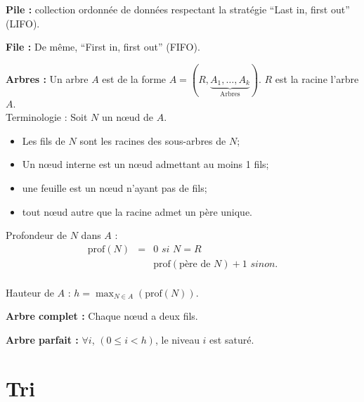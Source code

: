 \documentclass[a4paper, 8pt]{article}
\begin{document}
\begin{multicols*}{3}
\textbf{Pile :} collection ordonnée de données respectant la stratégie \enquote{Last in, first out} (LIFO).

\textbf{File :} De même, \enquote{First in, first out} (FIFO).

\textbf{Arbres :} Un arbre $A$ est de la forme $A = (R, \underbrace{A_1, \ldots, A_k}_{\text{Arbres}})$. $R$ est la racine l'arbre $A$.\\
Terminologie : Soit $N$ un nœud de $A$.
\begin{itemize}
\item Les fils de $N$ sont les racines des sous-arbres de $N$;
\item Un nœud interne est un nœud admettant au moins 1 fils;
\item une feuille est un nœud n'ayant pas de fils;
\item tout nœud autre que la racine admet un père unique.
\end{itemize}

Profondeur de $N$ dans $A$ :
\[
\begin{array}{rc|l}
\text{prof}(N) & = & 0 \textit{ si } N=R  \\
 & & \text{prof}(\text{père de }N) + 1 \textit{ sinon.}  \\
\end{array}
\]

Hauteur de $A$ : $h = \displaystyle \max_{N\in A}\left(\text{prof}(N)\right).$

\textbf{Arbre complet :} Chaque nœud a deux fils.

\textbf{Arbre parfait :} $\forall i$, $(0 \leqslant i < h)$, le niveau $i$ est saturé.

\section*{Tri}

\newcommand{\GO}{\text{O}}

%


\end{multicols*}
\end{document}
